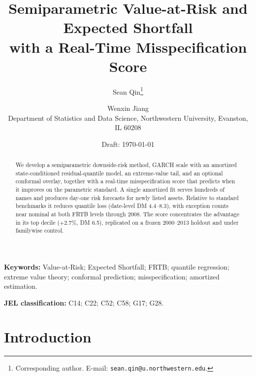 \documentclass[11pt]{article}
\title{Semiparametric Value-at-Risk and Expected Shortfall\\
with a Real-Time Misspecification Score}
\author{%
  Sean Qin\thanks{Corresponding author. E-mail:
  \texttt{sean.qin@u.northwestern.edu}.}
  \and
  Wenxin Jiang\\[4pt]
  \normalsize Department of Statistics and Data Science, Northwestern
  University, Evanston, IL 60208}
\date{Draft: \today}
\theoremstyle{remark}
\begin{document}
\maketitle

\begin{abstract}
We develop a semiparametric downside-risk method, GARCH scale with an
amortized state-conditioned residual-quantile model, an extreme-value
tail, and an optional conformal overlay, together with a real-time
misspecification score that predicts when it improves on the parametric
standard. A single amortized fit serves hundreds of names and produces
day-one risk forecasts for newly listed assets. Relative to standard
benchmarks it reduces quantile loss (date-level DM 4.4--8.3), with
exception counts near nominal at both FRTB levels through 2008. The
score concentrates the advantage in its top decile ($+2.7\%$, DM 6.5),
replicated on a frozen 2000--2013 holdout and under familywise
control.
\end{abstract}

\noindent\textbf{Keywords:} Value-at-Risk; Expected Shortfall; FRTB;
quantile regression; extreme value theory; conformal prediction;
misspecification; amortized estimation.

\medskip
\noindent\textbf{JEL classification:} C14; C22; C52; C58; G17; G28.

\section*{Introduction}\label{sec:intro}
\end{document}
